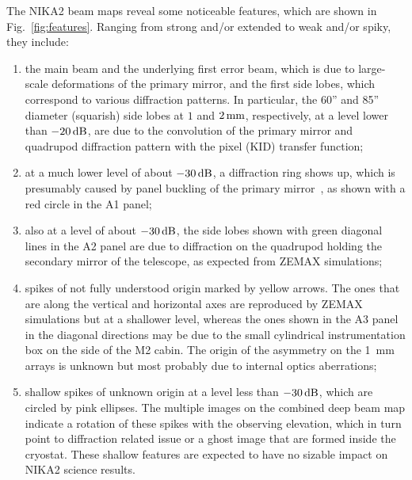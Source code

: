 The NIKA2 beam maps reveal some noticeable features, which are
shown in Fig.~\ref{fig:features}. Ranging from strong and/or extended to
weak and/or spiky, they include:
\begin{enumerate}
\item the main beam and the underlying first error
  beam, which is due to large-scale deformations of the primary
  mirror, and the first side lobes, {\lp which correspond to various diffraction
  patterns. In particular, the 60'' and 85'' diameter (squarish) side
  lobes at $1$ and $2\,\rm{mm}$, respectively, at a level lower than
  $-20\,\rm{dB}$, are due to the convolution of the primary mirror and
  quadrupod diffraction pattern with the pixel (KID) transfer function;}
\item at a much lower level of about $-30\,\rm{dB}$, a diffraction ring shows    
up, which is presumably caused by panel buckling of the primary 
  mirror~\citep{Greve2010}, as shown with a red circle in the A1 panel;
\item also at a level of about $-30\,\rm{dB}$, the side lobes shown with green
  diagonal lines in the A2 panel are due to diffraction on the
  quadrupod holding the secondary mirror of the telescope, as expected
  from ZEMAX simulations;  
\item spikes of not fully understood origin marked by yellow
  arrows. The ones that are along the vertical and
  horizontal axes are reproduced by ZEMAX simulations but at a 
  shallower level, whereas the ones shown in the A3 panel in the
  diagonal directions may be due to the small cylindrical
  instrumentation box on the side of the M2 cabin. The origin of the
  asymmetry on the 1~mm arrays is unknown but most probably due to
  internal optics aberrations;
\item shallow spikes of unknown origin at a level less than $-30\,\rm{dB}$, which are circled by pink
  ellipses. The multiple images on the combined deep beam map indicate
  a rotation of these spikes with the observing elevation, which in
  turn point to diffraction related issue or a ghost image that are
  formed inside the cryostat. These shallow features are expected to
  have no sizable impact on NIKA2 science results.
\end{enumerate}

